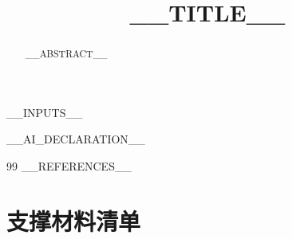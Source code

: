 \documentclass[12pt,a4paper]{ctexart}
\title{__TITLE__}
\author{}
\date{}
\begin{document}
\maketitle

\begin{abstract}
__ABSTRACT__
\end{abstract}

\newpage

__INPUTS__

__AI_DECLARATION__

\begin{thebibliography}{99}
__REFERENCES__
\end{thebibliography}

\appendix
\section*{支撑材料清单}
\end{document}
